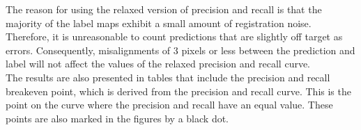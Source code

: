 The reason for using the relaxed version of precision and recall is that the majority of the label maps exhibit a small amount of registration noise. Therefore, it is unreasonable to count predictions that are slightly off target as errors. Consequently, misalignments of 3 pixels or less between the prediction and label will not affect the values of the relaxed precision and recall curve.\\

The results are also presented in tables that include the precision and recall breakeven point, which is derived from the precision and recall curve. This is the point on the curve where the precision and recall have an equal value. These points are also marked in the figures by a black dot.\\



